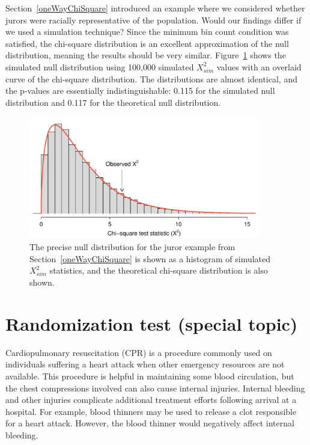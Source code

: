 \begin{example}{Section~\ref{oneWayChiSquare} introduced an example where we considered whether jurors were racially representative of the population. Would our findings differ if we used a simulation technique?}
Since the minimum bin count condition was satisfied, the chi-square distribution is an excellent approximation of the null distribution, meaning the results should be very similar. Figure~\ref{jurorChiSquareSimulated} shows the simulated null distribution using 100,000 simulated $X_{sim}^2$ values with an overlaid curve of the chi-square distribution. The distributions are almost identical, and the p-values are essentially indistinguishable: 0.115 for the simulated null distribution and 0.117 for the theoretical null distribution.
\end{example}

\begin{figure}[h]
\centering
\includegraphics[width=0.9\textwidth]{ch_inference_for_props/figures/jurorChiSquareSimulated/jurorChiSquareSimulated}
\caption{The precise null distribution for the juror example from Section~\ref{oneWayChiSquare} is shown as a histogram of simulated $X_{sim}^2$ statistics, and the theoretical chi-square distribution is also shown.}
\label{jurorChiSquareSimulated}
\end{figure}


\section{Randomization test (special topic)}
\label{smallSampleHTForTwoOrMoreProportion}


Cardiopulmonary resuscitation (CPR) is a procedure commonly used on individuals suffering a heart attack when other emergency resources are not available. This procedure is helpful in maintaining some blood circulation, but the chest compressions involved can also cause internal injuries. Internal bleeding and other injuries complicate additional treatment efforts following arrival at a hospital. For example, blood thinners may be used to release a clot responsible for a heart attack. However, the blood thinner would negatively affect internal bleeding.

